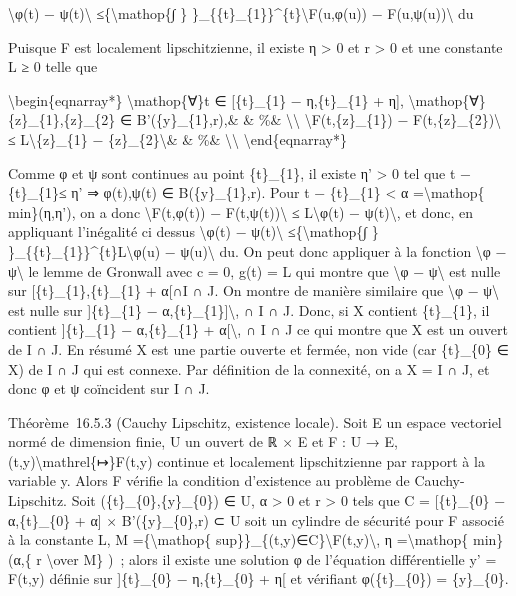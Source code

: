 \documentclass[]{article}
\begin{document}
\textbackslash{}\textbar{}φ(t) − ψ(t)\textbackslash{}\textbar{}
≤\{\textbackslash{}mathop\{∫ \}
\}\_\{\{t\}\_\{1\}\}\^{}\{t\}\textbackslash{}\textbar{}F(u,φ(u)) −
F(u,ψ(u))\textbackslash{}\textbar{} du

Puisque F est localement lipschitzienne, il existe η \textgreater{} 0 et
r \textgreater{} 0 et une constante L ≥ 0 telle que

\textbackslash{}begin\{eqnarray*\} \textbackslash{}mathop\{∀\}t ∈
{[}\{t\}\_\{1\} − η,\{t\}\_\{1\} + η{]},
\textbackslash{}mathop\{∀\}\{z\}\_\{1\},\{z\}\_\{2\} ∈
B'(\{y\}\_\{1\},r),\& \& \%\& \textbackslash{}\textbackslash{}
\textbackslash{}\textbar{}F(t,\{z\}\_\{1\}) −
F(t,\{z\}\_\{2\})\textbackslash{}\textbar{} ≤
L\textbackslash{}\textbar{}\{z\}\_\{1\} −
\{z\}\_\{2\}\textbackslash{}\textbar{}\& \& \%\&
\textbackslash{}\textbackslash{} \textbackslash{}end\{eqnarray*\}

Comme φ et ψ sont continues au point \{t\}\_\{1\}, il existe η'
\textgreater{} 0 tel que \textbar{}t − \{t\}\_\{1\}\textbar{}≤ η' ⇒
φ(t),ψ(t) ∈ B(\{y\}\_\{1\},r). Pour \textbar{}t − \{t\}\_\{1\}\textbar{}
\textless{} α =\textbackslash{}mathop\{ min\}(η,η'), on a donc
\textbackslash{}\textbar{}F(t,φ(t)) −
F(t,ψ(t))\textbackslash{}\textbar{} ≤ L\textbackslash{}\textbar{}φ(t) −
ψ(t)\textbackslash{}\textbar{}, et donc, en appliquant l'inégalité ci
dessus \textbackslash{}\textbar{}φ(t) − ψ(t)\textbackslash{}\textbar{}
≤\{\textbackslash{}mathop\{∫ \}
\}\_\{\{t\}\_\{1\}\}\^{}\{t\}L\textbackslash{}\textbar{}φ(u) −
ψ(u)\textbackslash{}\textbar{} du. On peut donc appliquer à la fonction
\textbackslash{}\textbar{}φ − ψ\textbackslash{}\textbar{} le lemme de
Gronwall avec c = 0, g(t) = L qui montre que \textbackslash{}\textbar{}φ
− ψ\textbackslash{}\textbar{} est nulle sur {[}\{t\}\_\{1\},\{t\}\_\{1\}
+ α{[}∩I ∩ J. On montre de manière similaire que
\textbackslash{}\textbar{}φ − ψ\textbackslash{}\textbar{} est nulle sur
{]}\{t\}\_\{1\} − α,\{t\}\_\{1\}{]}\textbackslash{}, ∩ I ∩ J. Donc, si X
contient \{t\}\_\{1\}, il contient {]}\{t\}\_\{1\} − α,\{t\}\_\{1\} +
α{[}\textbackslash{}, ∩ I ∩ J ce qui montre que X est un ouvert de I ∩
J. En résumé X est une partie ouverte et fermée, non vide (car
\{t\}\_\{0\} ∈ X) de I ∩ J qui est connexe. Par définition de la
connexité, on a X = I ∩ J, et donc φ et ψ coïncident sur I ∩ J.

Théorème~16.5.3 (Cauchy Lipschitz, existence locale). Soit E un espace
vectoriel normé de dimension finie, U un ouvert de ℝ × E et F : U → E,
(t,y)\textbackslash{}mathrel\{↦\}F(t,y) continue et localement
lipschitzienne par rapport à la variable y. Alors F vérifie la condition
d'existence au problème de Cauchy-Lipschitz. Soit
(\{t\}\_\{0\},\{y\}\_\{0\}) ∈ U, α \textgreater{} 0 et r \textgreater{}
0 tels que C = {[}\{t\}\_\{0\} − α,\{t\}\_\{0\} + α{]} ×
B'(\{y\}\_\{0\},r) ⊂ U soit un cylindre de sécurité pour F associé à la
constante L, M =\{\textbackslash{}mathop\{
sup\}\}\_\{(t,y)∈C\}\textbackslash{}\textbar{}F(t,y)\textbackslash{}\textbar{},
η =\textbackslash{}mathop\{ min\}(α,\{ r \textbackslash{}over M\} )~;
alors il existe une solution φ de l'équation différentielle y' = F(t,y)
définie sur {]}\{t\}\_\{0\} − η,\{t\}\_\{0\} + η{[} et vérifiant
φ(\{t\}\_\{0\}) = \{y\}\_\{0\}.
\end{document}

